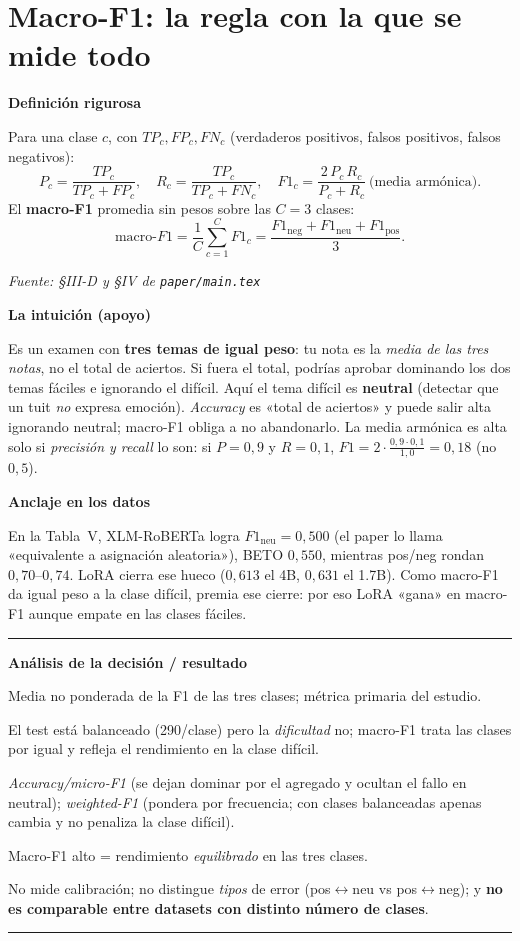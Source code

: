 \documentclass[11pt,a4paper]{article}
\newcommand{\nivel}[1]{\medskip\noindent\textbf{\textcolor{blue!45!black}{#1}}\par\nopagebreak\smallskip}
\newcommand{\fuente}[1]{\nopagebreak\par\hfill{\footnotesize\textit{Fuente: #1}}\par}
\newenvironment{analisis}{%
  \medskip\par\noindent\rule{\linewidth}{0.4pt}\par\nopagebreak
  \textbf{Análisis de la decisión / resultado}\par\nopagebreak\smallskip
  \begin{description}[leftmargin=2.6cm,style=nextline,font=\bfseries]
}{%
  \end{description}\noindent\rule{\linewidth}{0.4pt}\par\medskip
}
\begin{document}
\section{Macro-F1: la regla con la que se mide todo}\label{sec:macrof1}

\nivel{Definición rigurosa}
Para una clase $c$, con $TP_c,FP_c,FN_c$ (verdaderos positivos, falsos positivos, falsos negativos):
\[
P_c = \frac{TP_c}{TP_c + FP_c}, \quad
R_c = \frac{TP_c}{TP_c + FN_c}, \quad
F1_c = \frac{2\,P_c\,R_c}{P_c + R_c}\ \text{(media armónica)}.
\]
El \textbf{macro-F1} promedia sin pesos sobre las $C=3$ clases:
\[
\text{macro-}F1 = \frac{1}{C}\sum_{c=1}^{C} F1_c = \frac{F1_{\text{neg}}+F1_{\text{neu}}+F1_{\text{pos}}}{3}.
\]
\fuente{\S III-D y \S IV de \texttt{paper/main.tex}}

\nivel{La intuición (apoyo)}
Es un examen con \textbf{tres temas de igual peso}: tu nota es la \emph{media de las tres notas},
no el total de aciertos. Si fuera el total, podrías aprobar dominando los dos temas fáciles e
ignorando el difícil. Aquí el tema difícil es \textbf{neutral} (detectar que un tuit \emph{no}
expresa emoción). \emph{Accuracy} es «total de aciertos» y puede salir alta ignorando neutral;
macro-F1 obliga a no abandonarlo. La media armónica es alta solo si \emph{precisión y recall} lo
son: si $P=0{,}9$ y $R=0{,}1$, $F1 = 2\cdot\frac{0{,}9\cdot0{,}1}{1{,}0}=0{,}18$ (no $0{,}5$).

\nivel{Anclaje en los datos}
En la Tabla~V, XLM-RoBERTa logra $F1_{\text{neu}}=0{,}500$ (el paper lo llama «equivalente a
asignación aleatoria»), BETO $0{,}550$, mientras pos/neg rondan $0{,}70$--$0{,}74$. LoRA cierra ese
hueco ($0{,}613$ el 4B, $0{,}631$ el 1.7B). Como macro-F1 da igual peso a la clase difícil, premia
ese cierre: por eso LoRA «gana» en macro-F1 aunque empate en las clases fáciles.

\begin{analisis}
  \item[Qué] Media no ponderada de la F1 de las tres clases; métrica primaria del estudio.
  \item[Por qué] El test está balanceado (290/clase) pero la \emph{dificultad} no; macro-F1 trata
        las clases por igual y refleja el rendimiento en la clase difícil.
  \item[Alternativas descartadas] \emph{Accuracy/micro-F1} (se dejan dominar por el agregado y
        ocultan el fallo en neutral); \emph{weighted-F1} (pondera por frecuencia; con clases
        balanceadas apenas cambia y no penaliza la clase difícil).
  \item[Qué significa] Macro-F1 alto = rendimiento \emph{equilibrado} en las tres clases.
  \item[Qué NO significa] No mide calibración; no distingue \emph{tipos} de error
        (pos$\leftrightarrow$neu vs pos$\leftrightarrow$neg); y \textbf{no es comparable entre
        datasets con distinto número de clases}.
\end{analisis}
\end{document}

